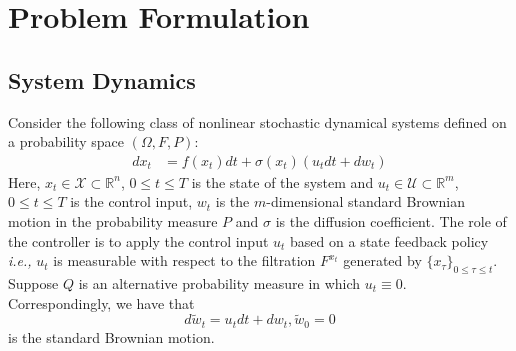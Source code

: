 \documentclass[letterpaper]{article} %
\newcommand{\ie}{\textit{i.e., }}
\begin{document}

\section{Problem Formulation}
\label{sec:problem_formulation}

\subsection{System Dynamics}
Consider the following class of nonlinear stochastic dynamical systems defined on a probability space $(\Omega,F,P)$:
\begin{equation}
\label{eq:continuous_dynamics}
\begin{aligned}
d x_t & =f\left(x_t\right) d t+\sigma\left(x_t\right) \left(u_t dt + dw_t\right)
\end{aligned}
\end{equation}
Here, $x_t \in \mathcal{X} \subset \mathbb{R}^n$, $0 \leq t \leq T$ is the state of the system and $u_t \in \mathcal{U} \subset \mathbb{R}^m$, $0 \leq t \leq T$ is the control input, $w_t$ is the $m$-dimensional standard Brownian motion in the probability measure $P$ and $\sigma$ is the diffusion coefficient.
The role of the controller is to apply the control input $u_t$ based on a state feedback policy \ie $u_t$ is measurable with respect to the filtration $F^{x_t}$ generated by $\{x_\tau\}_{0\leq \tau\leq t}$. Suppose $Q$ is an alternative probability measure in which $u_t \equiv 0$. Correspondingly, we have that
\begin{equation}
    d\tilde{w}_t=u_tdt+dw_t, \tilde{w}_0=0
\end{equation} 
is the standard Brownian motion.
\end{document}
